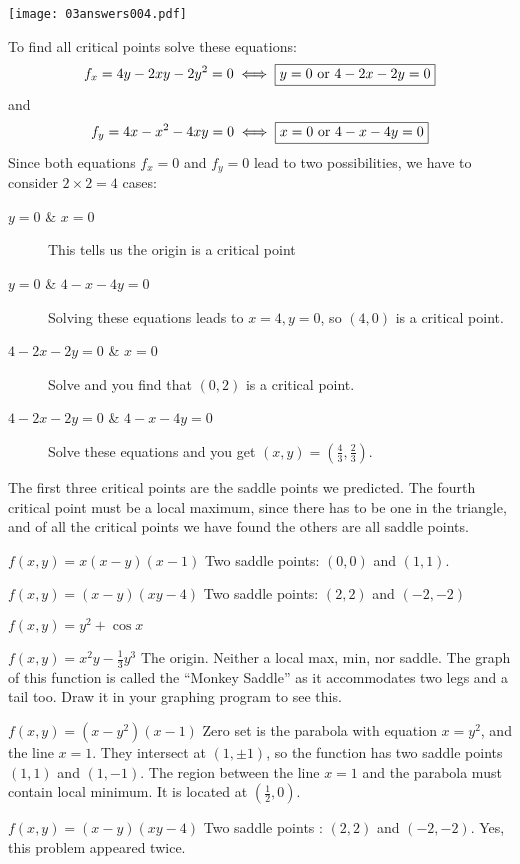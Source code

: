 \begin{multicols}{2}
\begin{center}
  \texttt{[image: 03answers004.pdf]}
\end{center}
To find all critical points solve these equations:
\[
f_x = 4y-2xy-2y^2 = 0 \iff \text{\framebox{$y=0$ or $4-2x-2y=0$}}
\]
and 
\[
f_y = 4x-x^2-4xy=0  \iff \text{\framebox{$x=0$ or $4-x-4y=0$}}
\]
Since both equations $f_x=0$ and $f_y=0$ lead to two possibilities, we
have to consider $2\times 2=4$ cases:
\begin{description}
  \item[$y=0$ \& $x=0$] This tells us the origin is a critical point
  \item[$y=0$ \& $4-x-4y=0$] Solving these equations leads to
    $x=4, y=0$, so $(4,0)$ is a critical point.
  \item[$4-2x-2y=0$ \& $x=0$] Solve and you find that $(0,2)$ is a
    critical point.
  \item[$4-2x-2y=0$ \& $4-x-4y=0$] Solve these equations and you get
    $(x,y) = (\tfrac43, \tfrac23)$.
\end{description}
The first three critical points are the saddle points we predicted.
The fourth critical point must be a local maximum, since there has to
be one in the triangle, and of all the critical points we have found
the others are all saddle points.
\endanswer

\subprob $f(x,y)=x(x-y)(x-1)$ 
\answer
Two saddle points:  $(0,0)$ and $(1,1)$.
\endanswer

\subprob $f(x,y)=(x-y)(xy-4)$ 
%
\answer Two saddle points:  $(2,2)$ and $(-2,-2)$  
\endanswer

\subprob $f(x,y)=y^2+\cos x$ 
%

\subprob $f(x,y)=x^2y-\frac13 y^3$ 
%
\answer The origin. Neither a local max, min, nor saddle.  
The graph of this function is called the ``Monkey Saddle'' as
it accommodates two legs and a tail too.  Draw it in your graphing
program to see this.
\endanswer

\subprob $f(x,y)=(x-y^2)(x-1)$ 
%
\answer    
Zero set is the parabola with equation $x=y^2$, and the line
$x=1$.  They intersect at $(1, \pm1)$, so the function has two saddle
points $(1,1)$ and $(1,-1)$.  The region between the line $x=1$ and
the parabola must contain  local minimum.  It is located at
$(\frac12, 0)$.
\endanswer

\subprob $f(x,y)=(x-y)(xy-4)$ 
%
\answer Two saddle points : $(2,2)$ and $(-2,-2)$.  
Yes, this problem appeared twice.
\endanswer


\end{multicols}
